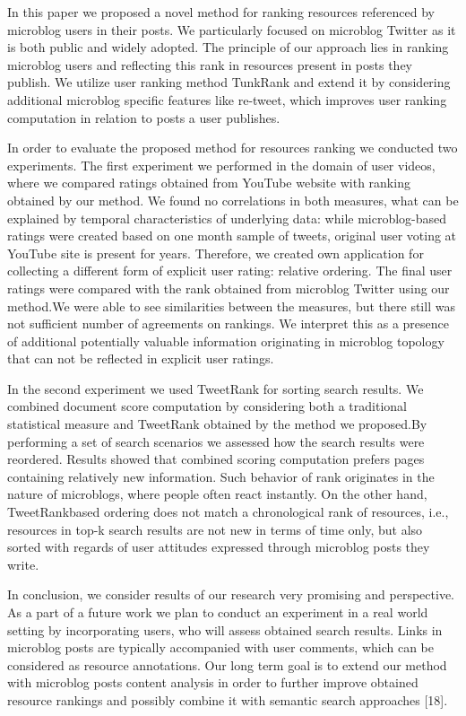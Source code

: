 \documentclass[]{article}
\begin{document}
In this paper we proposed a novel method for ranking resources referenced
by microblog users in their posts. We particularly focused on microblog Twitter
as it is both public and widely adopted. The principle of our approach lies in
ranking microblog users and reflecting this rank in resources present in posts they
publish. We utilize user ranking method TunkRank and extend it by considering
additional microblog specific features like re-tweet, which improves user ranking
computation in relation to posts a user publishes.

In order to evaluate the proposed method for resources ranking we conducted
two experiments. The first experiment we performed in the domain of user videos,
where we compared ratings obtained from YouTube website with ranking obtained
by our method. We found no correlations in both measures, what can be
explained by temporal characteristics of underlying data: while microblog-based
ratings were created based on one month sample of tweets, original user voting
at YouTube site is present for years. Therefore, we created own application
for collecting a different form of explicit user rating: relative ordering. The final
user ratings were compared with the rank obtained from microblog Twitter using
our method.We were able to see similarities between the measures, but there still was not sufficient number of agreements on rankings. We interpret this as a
presence of additional potentially valuable information originating in microblog
topology that can not be reflected in explicit user ratings.

In the second experiment we used TweetRank for sorting search results. We
combined document score computation by considering both a traditional statistical
measure and TweetRank obtained by the method we proposed.By performing
a set of search scenarios we assessed how the search results were reordered.
Results showed that combined scoring computation prefers pages containing
relatively new information. Such behavior of rank originates in the nature of
microblogs, where people often react instantly. On the other hand, TweetRankbased
ordering does not match a chronological rank of resources, i.e., resources
in top-k search results are not new in terms of time only, but also sorted with
regards of user attitudes expressed through microblog posts they write.

In conclusion, we consider results of our research very promising and perspective.
As a part of a future work we plan to conduct an experiment in a real world
setting by incorporating users, who will assess obtained search results. Links in
microblog posts are typically accompanied with user comments, which can be
considered as resource annotations. Our long term goal is to extend our method
with microblog posts content analysis in order to further improve obtained resource
rankings and possibly combine it with semantic search approaches [18].
\end{document}
